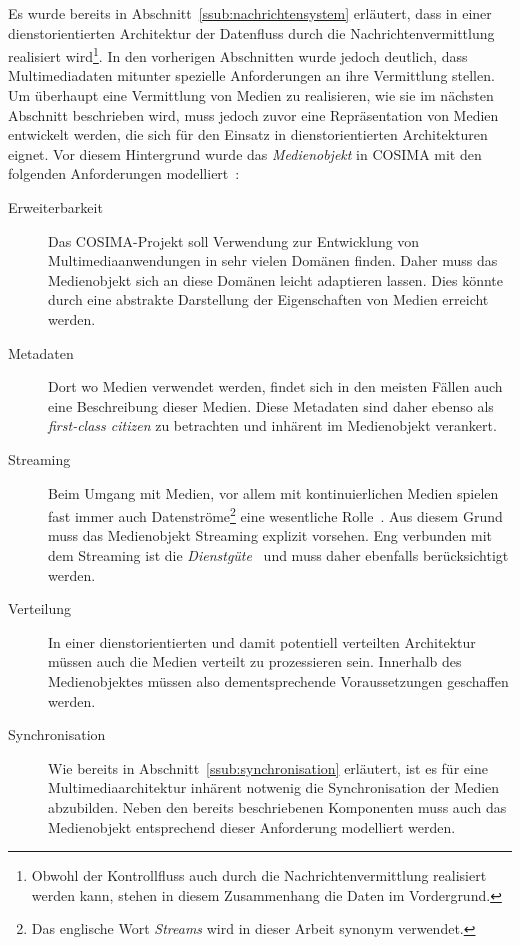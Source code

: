   Es wurde bereits in Abschnitt~\ref{ssub:nachrichtensystem} erläutert, dass in einer dienstorientierten Architektur der Datenfluss durch die Nachrichtenvermittlung realisiert wird\footnote{Obwohl der Kontrollfluss auch durch die Nachrichtenvermittlung realisiert werden kann, stehen in diesem Zusammenhang die Daten im Vordergrund.}. In den vorherigen Abschnitten wurde jedoch deutlich, dass Multimediadaten mitunter spezielle Anforderungen an ihre Vermittlung stellen. Um überhaupt eine Vermittlung von Medien zu realisieren, wie sie im nächsten Abschnitt beschrieben wird, muss jedoch zuvor eine Repräsentation von Medien entwickelt werden, die sich für den Einsatz in dienstorientierten Architekturen eignet. Vor diesem Hintergrund wurde das \emph{Medienobjekt} in COSIMA mit den folgenden Anforderungen modelliert~\citep[S. 34]{bericht}:
  
  \begin{description}
    \item[Erweiterbarkeit] Das COSIMA-Projekt soll Verwendung zur Entwicklung von Multimediaanwendungen in sehr vielen Domänen finden. Daher muss das Medienobjekt sich an diese Domänen leicht adaptieren lassen. Dies könnte durch eine abstrakte Darstellung der Eigenschaften von Medien erreicht werden.
    \item[Metadaten] Dort wo Medien verwendet werden, findet sich in den meisten Fällen auch eine Beschreibung dieser Medien. Diese Metadaten sind daher ebenso als \emph{first-class citizen} zu betrachten und inhärent im Medienobjekt verankert.
    \item[Streaming] Beim Umgang mit Medien, vor allem mit kontinuierlichen Medien spielen fast immer auch Datenströme\footnote{Das englische Wort \emph{Streams} wird in dieser Arbeit synonym verwendet.} eine wesentliche Rolle~\citep[S. 14ff]{multimedia_technologie}. Aus diesem Grund muss das Medienobjekt Streaming explizit vorsehen. Eng verbunden mit dem Streaming ist die \emph{Dienstgüte}~\citep{multimedia_technologie} und muss daher ebenfalls berücksichtigt werden.
    \item[Verteilung] In einer dienstorientierten und damit potentiell verteilten Architektur müssen auch die Medien verteilt zu prozessieren sein. Innerhalb des Medienobjektes müssen also dementsprechende Voraussetzungen geschaffen werden.
    \item[Synchronisation] Wie bereits in Abschnitt~\ref{ssub:synchronisation} erläutert, ist es für eine Multimediaarchitektur inhärent notwenig die Synchronisation der Medien abzubilden. Neben den bereits beschriebenen Komponenten muss auch das Medienobjekt entsprechend dieser Anforderung modelliert werden.
  \end{description}

